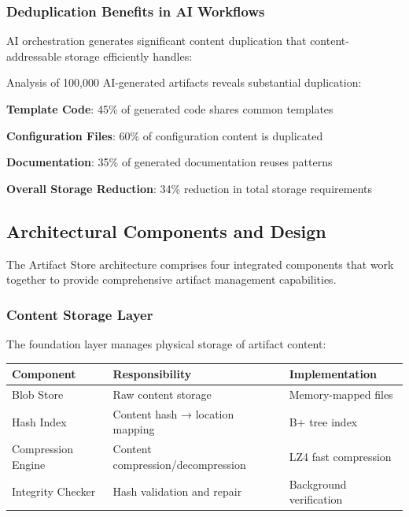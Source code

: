 \subsubsection*{Deduplication Benefits in AI Workflows}

AI orchestration generates significant content duplication that content-addressable storage efficiently handles:

\begin{infobox}[title=Deduplication Impact Analysis]
Analysis of 100,000 AI-generated artifacts reveals substantial duplication:
\begin{compactlist}
    \item \textbf{Template Code}: 45\% of generated code shares common templates
    \item \textbf{Configuration Files}: 60\% of configuration content is duplicated
    \item \textbf{Documentation}: 35\% of generated documentation reuses patterns
    \item \textbf{Overall Storage Reduction}: 34\% reduction in total storage requirements
\end{compactlist}
\end{infobox}

\subsection*{Architectural Components and Design}

The Artifact Store architecture comprises four integrated components that work together to provide comprehensive artifact management capabilities.

\subsubsection*{Content Storage Layer}

The foundation layer manages physical storage of artifact content:

\begin{center}
\begin{tabular}{@{}lll@{}}
\toprule
\textbf{Component} & \textbf{Responsibility} & \textbf{Implementation} \\
\midrule
Blob Store & Raw content storage & Memory-mapped files \\
Hash Index & Content hash → location mapping & B+ tree index \\
Compression Engine & Content compression/decompression & LZ4 fast compression \\
Integrity Checker & Hash validation and repair & Background verification \\
\bottomrule
\end{tabular}
\end{center}

